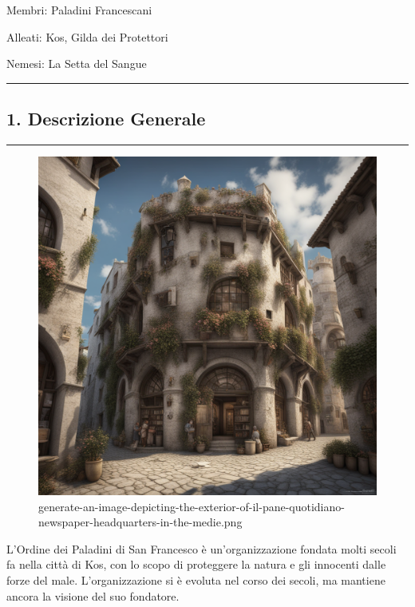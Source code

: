 Membri: Paladini Francescani

Alleati: Kos, Gilda dei Protettori

Nemesi: La Setta del Sangue

\begin{center}\rule{0.5\linewidth}{0.5pt}\end{center}

\subsection{1. Descrizione Generale}\label{descrizione-generale}

\begin{center}\rule{0.5\linewidth}{0.5pt}\end{center}

\begin{figure}
\centering
\includegraphics{generate-an-image-depicting-the-exterior-of-il-pane-quotidiano-newspaper-headquarters-in-the-medie.png}
\caption{generate-an-image-depicting-the-exterior-of-il-pane-quotidiano-newspaper-headquarters-in-the-medie.png}
\end{figure}

L'Ordine dei Paladini di San Francesco è un'organizzazione fondata molti
secoli fa nella città di Kos, con lo scopo di proteggere la natura e gli
innocenti dalle forze del male. L'organizzazione si è evoluta nel corso
dei secoli, ma mantiene ancora la visione del suo fondatore.

